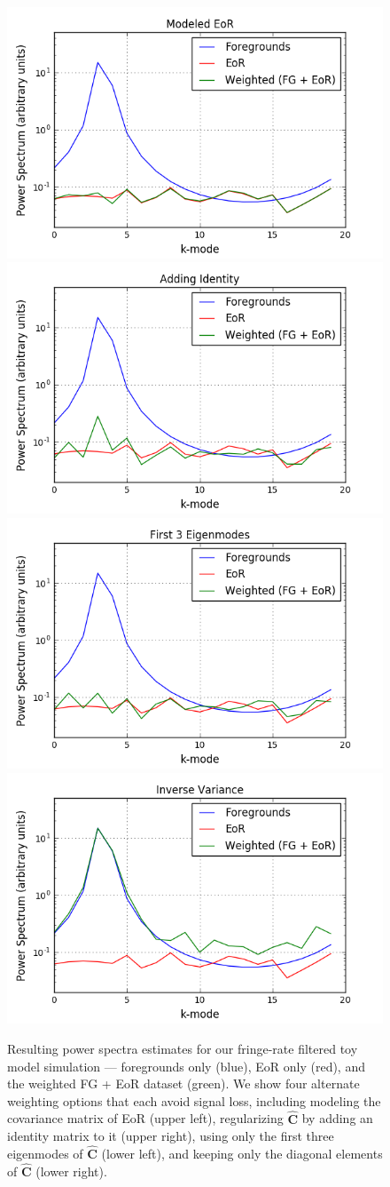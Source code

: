 \documentclass[preprint2,numberedappendix,tighten]{aastex6}  %
\begin{document}
\begin{figure}
	\centering
	\includegraphics[trim={0.4cm 0cm 1.3cm 0cm},clip,height=0.3\textwidth]{plots/toy_sigloss10.png}
	\includegraphics[trim={1cm 0cm 1.3cm 0cm},clip,height=0.3\textwidth]{plots/toy_sigloss8.png}
	\includegraphics[trim={0.4cm 0cm 1.3cm 0cm},clip,height=0.3\textwidth]{plots/toy_sigloss9.png}
	\includegraphics[trim={1cm 0cm 1.3cm 0cm},clip,height=0.3\textwidth]{plots/toy_sigloss11.png}
	\caption{Resulting power spectra estimates for our fringe-rate filtered toy model simulation --- foregrounds only (blue), 
EoR only (red), and the weighted FG + EoR dataset (green). We show four alternate weighting options that each avoid signal 
loss, including modeling the covariance matrix of EoR (upper left), regularizing $\hat{\textbf{C}}$ by adding an identity matrix to 
it (upper right), using only the first three eigenmodes of $\hat{\textbf{C}}$ (lower left), and keeping only the diagonal elements of 
$\hat{\textbf{C}}$ (lower right).}
	\label{fig:toy_sigloss8}
\end{figure}
\end{document}
